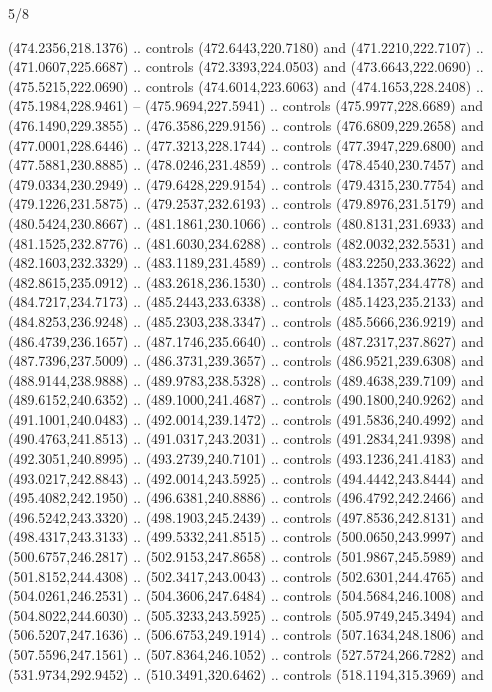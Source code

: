 \begin{flagdescription}{5/8}
\begin{scope}[shift={(0.5\flaglength,0.5\flagwidth)},scale=\flagwidth*\stretchfactor/820]
\begin{scope}[scale=1.84,xshift=-135mm,yshift=84mm]
\begin{scope}[y=0.80pt, x=0.80pt, yscale=-1, xscale=1]
\begin{scope}[cm={{1.01416,0.0,0.0,1.033,(-6.79641,-9.89449)}}]
\begin{scope}[draw=c34541f,fill=c448127,line width=0.174\lw]
  (474.2356,218.1376) .. controls (472.6443,220.7180) and (471.2210,222.7107) ..
  (471.0607,225.6687) .. controls (472.3393,224.0503) and (473.6643,222.0690) ..
  (475.5215,222.0690) .. controls (474.6014,223.6063) and (474.1653,228.2408) ..
  (475.1984,228.9461) -- (475.9694,227.5941) .. controls (475.9977,228.6689) and
  (476.1490,229.3855) .. (476.3586,229.9156) .. controls (476.6809,229.2658) and
  (477.0001,228.6446) .. (477.3213,228.1744) .. controls (477.3947,229.6800) and
  (477.5881,230.8885) .. (478.0246,231.4859) .. controls (478.4540,230.7457) and
  (479.0334,230.2949) .. (479.6428,229.9154) .. controls (479.4315,230.7754) and
  (479.1226,231.5875) .. (479.2537,232.6193) .. controls (479.8976,231.5179) and
  (480.5424,230.8667) .. (481.1861,230.1066) .. controls (480.8131,231.6933) and
  (481.1525,232.8776) .. (481.6030,234.6288) .. controls (482.0032,232.5531) and
  (482.1603,232.3329) .. (483.1189,231.4589) .. controls (483.2250,233.3622) and
  (482.8615,235.0912) .. (483.2618,236.1530) .. controls (484.1357,234.4778) and
  (484.7217,234.7173) .. (485.2443,233.6338) .. controls (485.1423,235.2133) and
  (484.8253,236.9248) .. (485.2303,238.3347) .. controls (485.5666,236.9219) and
  (486.4739,236.1657) .. (487.1746,235.6640) .. controls (487.2317,237.8627) and
  (487.7396,237.5009) .. (486.3731,239.3657) .. controls (486.9521,239.6308) and
  (488.9144,238.9888) .. (489.9783,238.5328) .. controls (489.4638,239.7109) and
  (489.6152,240.6352) .. (489.1000,241.4687) .. controls (490.1800,240.9262) and
  (491.1001,240.0483) .. (492.0014,239.1472) .. controls (491.5836,240.4992) and
  (490.4763,241.8513) .. (491.0317,243.2031) .. controls (491.2834,241.9398) and
  (492.3051,240.8995) .. (493.2739,240.7101) .. controls (493.1236,241.4183) and
  (493.0217,242.8843) .. (492.0014,243.5925) .. controls (494.4442,243.8444) and
  (495.4082,242.1950) .. (496.6381,240.8886) .. controls (496.4792,242.2466) and
  (496.5242,243.3320) .. (498.1903,245.2439) .. controls (497.8536,242.8131) and
  (498.4317,243.3133) .. (499.5332,241.8515) .. controls (500.0650,243.9997) and
  (500.6757,246.2817) .. (502.9153,247.8658) .. controls (501.9867,245.5989) and
  (501.8152,244.4308) .. (502.3417,243.0043) .. controls (502.6301,244.4765) and
  (504.0261,246.2531) .. (504.3606,247.6484) .. controls (504.5684,246.1008) and
  (504.8022,244.6030) .. (505.3233,243.5925) .. controls (505.9749,245.3494) and
  (506.5207,247.1636) .. (506.6753,249.1914) .. controls (507.1634,248.1806) and
  (507.5596,247.1561) .. (507.8364,246.1052) .. controls (527.5724,266.7282) and
  (531.9734,292.9452) .. (510.3491,320.6462) .. controls (518.1194,315.3969) and

\end{scope}
\end{scope}
\end{scope}
\end{scope}
\end{scope}
\end{flagdescription}

